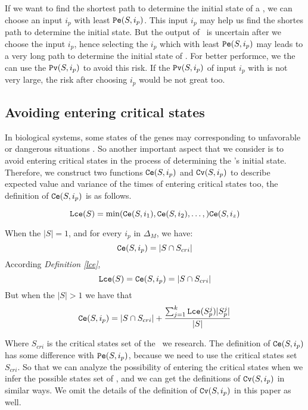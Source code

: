 If we want to find the shortest path to determine the initial state of a \BCN, we can choose an input $i_p$ with least ${\tt Pe}(S, i_p)$. This input $i_p$ may help us find the shortes path to determine the initial state. But the output of \BCNs\ is uncertain after we choose the input $i_p$, hence selecting the $i_p$ which with least ${\tt Pe}(S, i_p)$ may leads to a very long path to determine the initial state of \BCNs. For better performce, we the can use the ${\tt Pv}(S, i_p)$ to avoid this risk. If the ${\tt Pv}(S, i_p)$ of input $i_p$ with is not very large, the risk after choosing $i_p$ would be not great too.
\subsection{Avoiding entering critical states}
In biological systems, some states of the genes may corresponding to unfavorable or dangerous situations \cite{Li2014Controllability}. So another important aspect that we consider is to avoid entering critical states in the process of determining the \BCN's initial state. Therefore, we construct two functions $\Ce(S, i_p)$ and ${\tt Cv}(S, i_p)$ to describe expected value and variance of the times of entering critical states too, the definition of $\Ce(S, i_p)$ is as follows.\\
\begin{definition}[$\Lce(S)$] \label{lce}
\[{\tt Lce}(S)= \min({\tt Ce}(S, i_1),{\tt Ce}(S, i_2),\ldots,){\tt Ce}(S, i_z)\]
\end{definition}
\begin{definition}[$\Ce(S, i_p)$] 
When the $|S|=1$, and for every $i_p$ in $\Delta_M$, we have: \[{\tt Ce}(S, i_p)=|S \cap S_{cri} |\] 
According {\em Definition \ref{lce}}, %
\[{\tt Lce}(S)={\tt Ce}(S, i_p)=|S \cap S_{cri} |\] 
But when the $|S|>1$ 
we have that 
\[{\tt Ce}(S, i_p)=|S \cap S_{cri} | +\frac{\sum_{j=1}^k {\tt Lce}(S_p^j)|S_p^j|}{ |S|} \] 
\end{definition}

Where $S_{cri}$ is the critical states set of the \BCN\ we research. The definition of $\Ce(S, i_p)$ has some difference with ${\tt Pe}(S, i_p)$, because we need to use the critical states set $S_{cri}$. So that  we can analyze the possibility of entering the  critical states when we infer the possible states set of \BCNs, and we can get the definitions of ${\tt Cv}(S, i_p)$ in similar ways. We omit the details of the definition of ${\tt Cv}(S, i_p)$ in this paper as well. 

